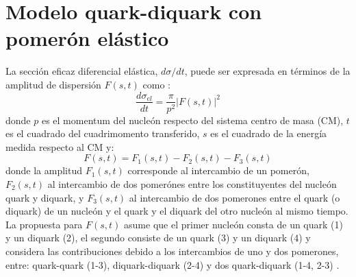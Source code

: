\section{Modelo quark-diquark con pomer\'on el\'astico}
La sección eficaz diferencial elástica, $d\sigma/dt$, puede ser expresada en términos de la amplitud de dispersión $F(s,t)$ como \cite{grichine}:
 \begin{equation}
\frac{d\sigma_{el}}{dt}=\frac{\pi}{p^2}|F(s,t)|^2
\end{equation}
donde $p$ es el momentum del nucle\'on respecto del sistema centro de masa (CM), $t$ es el cuadrado del cuadrimomento transferido, $s$ es el cuadrado de la energía medida respecto al CM \cite{carlosavila} y:
\begin{equation}\label{ecu2f}
F(s,t)=F_1(s,t)-F_2(s,t)-F_3(s,t)
\end{equation} 
donde la amplitud $F_1 (s, t)$ corresponde al intercambio de un pomer\'on, $F_2 (s, t)$ al intercambio de dos  pomer\'ones entre los constituyentes del nucle\'on quark y diquark, y $F_3 (s, t)$ al intercambio de dos pomerones entre el quark (o diquark) de un nucle\'on y el quark y el diquark del otro nucle\'on al mismo tiempo. La propuesta para $F(s,t)$ asume que el primer nucle\'on consta de un quark (1) y un diquark (2), el segundo consiste de un quark (3) y un diquark (4) y considera las contribuciones debido a los intercambios de uno y dos pomerones, entre: quark-quark (1-3), diquark-diquark (2-4) y dos quark-diquark  (1-4, 2-3) \cite{grichine}.
